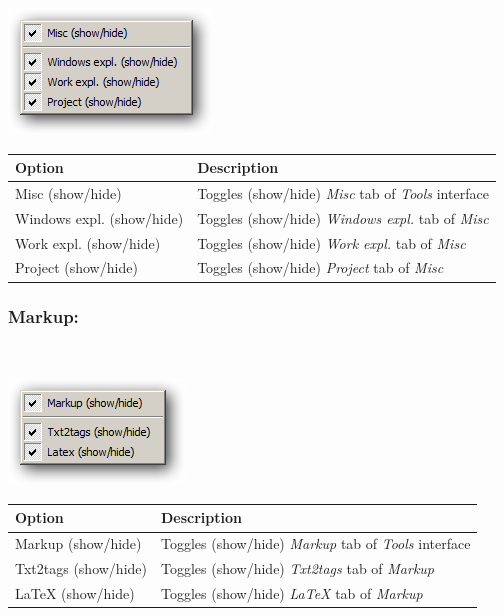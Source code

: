 \includegraphics[scale=0.50]{./res/menu_view_tools_resources_misc.png}\\

\begin{scriptsize}\begin{tabularx}{\textwidth}{>{\hsize=0.5\hsize}X>{\hsize=0.7\hsize}X}\\
    \hline
    \textbf{Option} & \textbf{Description} \\
    \hline
    Misc (show/hide) & Toggles (show/hide) \textit{Misc} tab of \textit{Tools} interface \\
    Windows expl. (show/hide) & Toggles (show/hide) \textit{Windows expl.} tab of \textit{Misc} \\
    Work expl. (show/hide) & Toggles (show/hide) \textit{Work expl.} tab of \textit{Misc} \\
    Project (show/hide) & Toggles (show/hide) \textit{Project} tab of \textit{Misc} \\
    \hline
  \end{tabularx}\end{scriptsize}


\hypertarget{menu_view_tools_resources_markup}{}
\subsubsection{Markup:}\\

\includegraphics[scale=0.50]{./res/menu_view_tools_resources_markup.png}\\

\begin{scriptsize}\begin{tabularx}{\textwidth}{>{\hsize=0.3\hsize}X>{\hsize=0.7\hsize}X}\\
    \hline
    \textbf{Option} & \textbf{Description} \\
    \hline
    Markup (show/hide) & Toggles (show/hide) \textit{Markup} tab of \textit{Tools} interface \\
    Txt2tags (show/hide) & Toggles (show/hide) \textit{Txt2tags} tab of \textit{Markup} \\
    LaTeX (show/hide) & Toggles (show/hide) \textit{LaTeX} tab of \textit{Markup} \\
    \hline
  \end{tabularx}\end{scriptsize}


